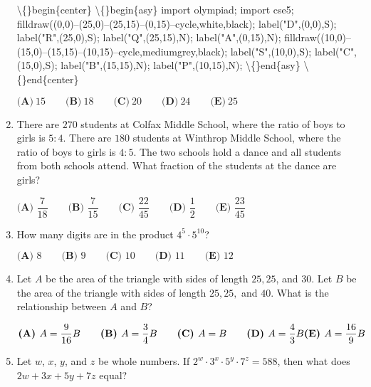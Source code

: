 \documentclass{article}
\begin{document}
\begin{enumerate}[label=\arabic*., itemsep=0.5em]
\textbackslash\{\}begin\{center\}
\textbackslash\{\}begin\{asy\}
import olympiad;
import cse5;
filldraw((0,0)--(25,0)--(25,15)--(0,15)--cycle,white,black);
label("D",(0,0),S);
label("R",(25,0),S);
label("Q",(25,15),N);
label("A",(0,15),N);
filldraw((10,0)--(15,0)--(15,15)--(10,15)--cycle,mediumgrey,black);
label("S",(10,0),S);
label("C",(15,0),S);
label("B",(15,15),N);
label("P",(10,15),N);
\textbackslash\{\}end\{asy\}
\textbackslash\{\}end\{center\}


\( \textbf{(A)}\ 15\qquad\textbf{(B)}\ 18\qquad\textbf{(C)}\ 20\qquad\textbf{(D)}\ 24\qquad\textbf{(E)}\ 25 \)\par \vspace{0.5em}\item There are \(270\) students at Colfax Middle School, where the ratio of boys to girls is \(5 : 4\). There are \(180\) students at Winthrop Middle School, where the ratio of boys to girls is \(4 : 5\). The two schools hold a dance and all students from both schools attend. What fraction of the students at the dance are girls?

\( \textbf{(A) } \dfrac7{18} \qquad\textbf{(B) } \dfrac7{15} \qquad\textbf{(C) } \dfrac{22}{45} \qquad\textbf{(D) } \dfrac12 \qquad\textbf{(E) } \dfrac{23}{45} \)\par \vspace{0.5em}\item How many digits are in the product \(4^5 \cdot 5^{10}\)?

\( \textbf{(A) } 8 \qquad\textbf{(B) } 9 \qquad\textbf{(C) } 10 \qquad\textbf{(D) } 11 \qquad\textbf{(E) } 12 \)\par \vspace{0.5em}\item Let \(A\) be the area of the triangle with sides of length \(25, 25\), and \(30\). Let \(B\) be the area of the triangle with sides of length \(25, 25,\) and \(40\). What is the relationship between \(A\) and \(B\)?

\( \textbf{(A) } A = \dfrac9{16}B \qquad\textbf{(B) } A = \dfrac34B \qquad\textbf{(C) } A=B \qquad\textbf{(D) } A = \dfrac43B \\ \\ \textbf{(E) }A = \dfrac{16}9B \)\par \vspace{0.5em}\item Let \(w\), \(x\), \(y\), and \(z\) be whole numbers. If \(2^w \cdot 3^x \cdot 5^y \cdot 7^z = 588\), then what does \(2w + 3x + 5y + 7z\) equal?


\end{enumerate}
\end{document}

